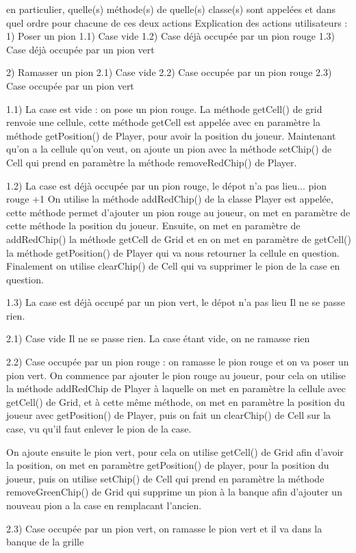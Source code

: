 en particulier, quelle(s) méthode(s) de quelle(s) classe(s) sont appelées et 
dans quel ordre pour chacune de ces deux actions
Explication des actions utilisateurs : 
1) Poser un pion
1.1) Case vide
1.2) Case déjà occupée par un pion rouge
1.3) Case déjà occupée par un pion vert

2) Ramasser un pion
2.1) Case vide
2.2) Case occupée par un pion rouge
2.3) Case occupée par un pion vert

1.1) La case est vide : on pose un pion rouge.
La méthode getCell() de grid renvoie une cellule, cette méthode getCell est appelée avec en paramètre la méthode getPosition() de Player, pour avoir la position du joueur.
Maintenant qu'on a la cellule qu'on veut, on ajoute un pion avec la méthode setChip() de Cell qui prend en paramètre la méthode removeRedChip() de Player.

1.2) La case est déjà occupée par un pion rouge, le dépot n'a pas lieu... pion rouge +1
On utilise la méthode addRedChip() de la classe Player est appelée, cette méthode permet d'ajouter un pion rouge au joueur, on met en paramètre de cette méthode la position du joueur. Ensuite, on met en paramètre de addRedChip() la méthode getCell de Grid et en on met en paramètre de getCell() la méthode getPosition() de Player qui va nous retourner la cellule en question.
Finalement on utilise clearChip() de Cell qui va supprimer le pion de la case en question.

1.3) La case est déjà occupé par un pion vert, le dépot n'a pas lieu
Il ne se passe rien.

2.1) Case vide
Il ne se passe rien. La case étant vide, on ne ramasse rien

2.2) Case occupée par un pion rouge : on ramasse le pion rouge et on va poser un pion vert.
On commence par ajouter le pion rouge au joueur, pour cela on utilise la méthode addRedChip de Player à laquelle on met en paramètre la cellule avec getCell() de Grid, et à cette même méthode,
on met en paramètre la position du joueur avec getPosition() de Player, puis on fait un clearChip() de Cell sur la case, vu qu'il faut enlever le pion de la case.

On ajoute ensuite le pion vert, pour cela on utilise getCell() de Grid afin d'avoir la position,
on met en paramètre getPosition() de player, pour la position du joueur, puis on utilise setChip() de Cell qui prend en paramètre la méthode removeGreenChip() de Grid qui supprime un pion à la banque afin d'ajouter un nouveau pion a la case en remplacant l'ancien.
	 


2.3) Case occupée par un pion vert, on ramasse le pion vert et il va dans la banque de la grille